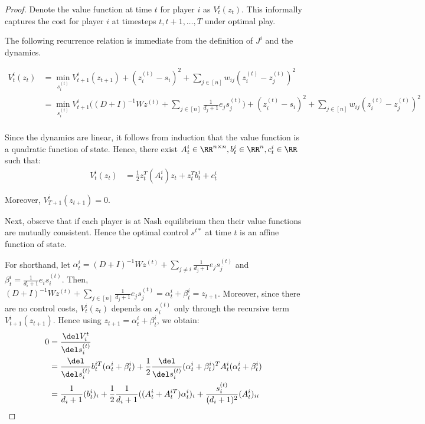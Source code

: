 \begin{proof}
Denote the value function at time $t$ for player $i$ as $V_t^i(z_t)$. This informally captures the cost for player $i$ at timesteps $t, t + 1, \dots, T$ under optimal play.  

The following recurrence relation is immediate from the definition of $J^i$ and the dynamics. 

\begin{align*}
V_t^i(z_t) &= \min\limits_{s_i^{(t)}}
V_{t+1}^{i}(z_{t+1})
+ (z_i^{(t)} - s_i)^2 + \sum_{j \in [n]} w_{ij} (z_i^{(t)} - z_j^{(t)})^2 \\
&= \min\limits_{s_i^{(t)}}
V_{t+1}^{i}
\bigg(
(D + I)^{-1} W z^{(t)} + \sum_{j \in [n]} \frac{1}{d_{j} + 1} e_j s_j^{(t)}
\bigg)
+ (z_i^{(t)} - s_i)^2 + \sum_{j \in [n]} w_{ij} (z_i^{(t)} - z_j^{(t)})^2 \\
\end{align*}

Since the dynamics are linear, it follows from induction that the value function is a quadratic function of state. Hence, there exist $A_t^i \in \RR^{n\times n}, b_t^i \in \RR^n, c_t^i \in \RR$ such that:  
\begin{align*}
V_t^i(z_t) &= \frac 1 2 z_t^T (A_t^i) z_t + z_t^T b_t^i + c_t^i
\end{align*}

Moreover, $V_{T+1}^i(z_{t+1}) = 0$. 

Next, observe that if each player is at Nash equilibrium then their value functions are mutually consistent. Hence the optimal control $s^{t *}$ at time $t$ is an affine function of state. 

For shorthand, let $\alpha_t^i = (D + I)^{-1} W z^{(t)} + \sum_{j \neq i} \frac{1}{d_{j} + 1} e_j s_j^{(t)}$ and $\beta_t^i = \frac{1}{d_i + 1} e_i s_i^{(t)}$. Then, $(D + I)^{-1} W z^{(t)} + \sum_{j \in [n]} \frac{1}{d_{j} + 1} e_j s_j^{(t)} = \alpha_t^i + \beta_t^i = z_{t+1}$. Moreover, since there are no control costs, $V_t^i(z_t)$ depends on $s_i^{(t)}$ only through the recursive term $V_{t+1}^i(z_{t+1})$. Hence using $z_{t+1} 
 = \alpha_t^i + \beta_t^i$, we obtain:
\begin{align*}
0 &= \frac{\del V_i^t}{\del s_i^{(t)}} \\
&= \frac{\del}{\del s_i^{(t)}} b_t^{iT} (\alpha_t^i + \beta_t^i)
+ \frac 1 2 \frac{\del}{\del s_i^{(t)}} (\alpha_t^i + \beta_t^i)^T A_t^i (\alpha_t^i + \beta_t^i) \\
&= \frac{1}{d_i + 1} (b_t^i)_i 
+ \frac 1 2 \frac{1}{d_i + 1} ((A_t^i + A_t^{iT}) \alpha_t^i)_{i}
+ \frac{s_{i}^{(t)}}{(d_i + 1)^2} (A_t^i)_{ii} 
\end{align*}


\end{proof}
